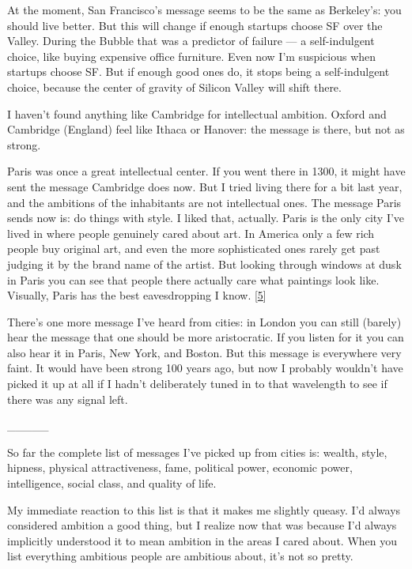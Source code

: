 At the moment, San Francisco's message seems to be the same as
Berkeley's: you should live better. But this will change if enough
startups choose SF over the Valley. During the Bubble that was a
predictor of failure --- a self-indulgent choice, like buying expensive
office furniture. Even now I'm suspicious when startups choose SF. But
if enough good ones do, it stops being a self-indulgent choice, because
the center of gravity of Silicon Valley will shift there.

I haven't found anything like Cambridge for intellectual ambition.
Oxford and Cambridge (England) feel like Ithaca or Hanover: the message
is there, but not as strong.

Paris was once a great intellectual center. If you went there in 1300,
it might have sent the message Cambridge does now. But I tried living
there for a bit last year, and the ambitions of the inhabitants are not
intellectual ones. The message Paris sends now is: do things with style.
I liked that, actually. Paris is the only city I've lived in where
people genuinely cared about art. In America only a few rich people buy
original art, and even the more sophisticated ones rarely get past
judging it by the brand name of the artist. But looking through windows
at dusk in Paris you can see that people there actually care what
paintings look like. Visually, Paris has the best eavesdropping I know.
{[}\hyperref[f5n]{5}{]}

There's one more message I've heard from cities: in London you can still
(barely) hear the message that one should be more aristocratic. If you
listen for it you can also hear it in Paris, New York, and Boston. But
this message is everywhere very faint. It would have been strong 100
years ago, but now I probably wouldn't have picked it up at all if I
hadn't deliberately tuned in to that wavelength to see if there was any
signal left.

\_\_\_\_\_

So far the complete list of messages I've picked up from cities is:
wealth, style, hipness, physical attractiveness, fame, political power,
economic power, intelligence, social class, and quality of life.

My immediate reaction to this list is that it makes me slightly queasy.
I'd always considered ambition a good thing, but I realize now that was
because I'd always implicitly understood it to mean ambition in the
areas I cared about. When you list everything ambitious people are
ambitious about, it's not so pretty.

